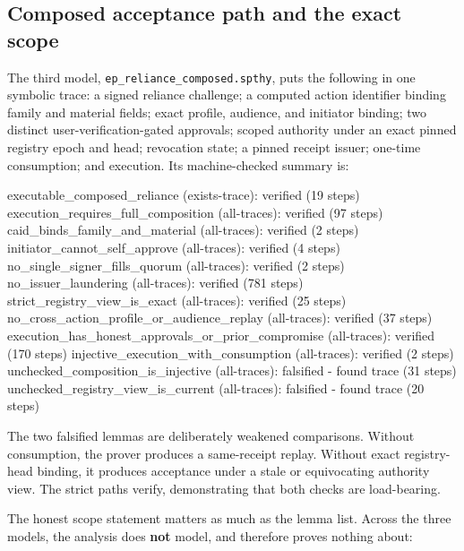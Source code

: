 \documentclass[11pt]{article}
\newcommand{\code}[1]{\texttt{#1}}
\begin{document}
\subsection{Composed acceptance path and the exact scope}

The third model, \code{ep\_reliance\_composed.spthy}, puts the following in one
symbolic trace: a signed reliance challenge; a computed action identifier binding
family and material fields; exact profile, audience, and initiator binding; two
distinct user-verification-gated approvals; scoped authority under an exact pinned
registry epoch and head; revocation state; a pinned receipt issuer; one-time
consumption; and execution. Its machine-checked summary is:

\begin{tool}
executable_composed_reliance (exists-trace): verified (19 steps)
execution_requires_full_composition (all-traces): verified (97 steps)
caid_binds_family_and_material (all-traces): verified (2 steps)
initiator_cannot_self_approve (all-traces): verified (4 steps)
no_single_signer_fills_quorum (all-traces): verified (2 steps)
no_issuer_laundering (all-traces): verified (781 steps)
strict_registry_view_is_exact (all-traces): verified (25 steps)
no_cross_action_profile_or_audience_replay (all-traces): verified (37 steps)
execution_has_honest_approvals_or_prior_compromise (all-traces): verified (170 steps)
injective_execution_with_consumption (all-traces): verified (2 steps)
unchecked_composition_is_injective (all-traces): falsified - found trace (31 steps)
unchecked_registry_view_is_current (all-traces): falsified - found trace (20 steps)
\end{tool}

The two falsified lemmas are deliberately weakened comparisons. Without consumption,
the prover produces a same-receipt replay. Without exact registry-head binding, it
produces acceptance under a stale or equivocating authority view. The strict paths
verify, demonstrating that both checks are load-bearing.

The honest scope statement matters as much as the lemma list. Across the three
models, the analysis does \textbf{not} model, and therefore proves nothing about:
\end{document}

